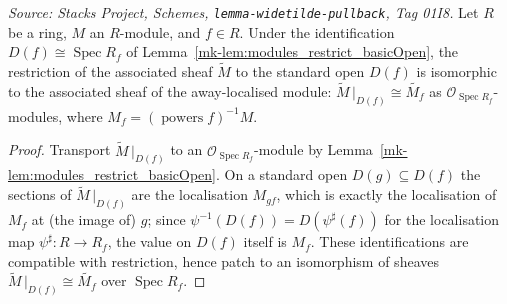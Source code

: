 \begin{lemma}
  \label{mk-lem:tilde_restrict_basicOpen}

  \textit{Source: Stacks Project, Schemes, \texttt{lemma-widetilde-pullback}, Tag 01I8.}
  Let \(R\) be a ring, \(M\) an \(R\)-module, and \(f \in R\). Under the identification
  \(D(f) \cong \operatorname{Spec} R_f\) of Lemma~\ref{mk-lem:modules_restrict_basicOpen}, the
  restriction of the associated sheaf \(\widetilde{M}\) to the standard open \(D(f)\) is
  isomorphic to the associated sheaf of the away-localised module:
  \(\widetilde{M}\,|_{D(f)} \cong \widetilde{M_f}\) as \(\mathcal{O}_{\operatorname{Spec}
  R_f}\)-modules, where \(M_f = (\operatorname{powers} f)^{-1} M\).
\end{lemma}
\begin{proof}
  Transport \(\widetilde{M}\,|_{D(f)}\) to an \(\mathcal{O}_{\operatorname{Spec}
  R_f}\)-module by Lemma~\ref{mk-lem:modules_restrict_basicOpen}. On a standard open
  \(D(g) \subseteq D(f)\) the sections of \(\widetilde{M}\,|_{D(f)}\) are the localisation
  \(M_{gf}\), which is exactly the localisation of \(M_f\) at (the image of) \(g\); since
  \(\psi^{-1}(D(f)) = D(\psi^\sharp(f))\) for the localisation map \(\psi^\sharp : R \to R_f\),
  the value on \(D(f)\) itself is \(M_f\). These identifications are compatible with
  restriction, hence patch to an isomorphism of sheaves
  \(\widetilde{M}\,|_{D(f)} \cong \widetilde{M_f}\) over \(\operatorname{Spec} R_f\).
\end{proof}

